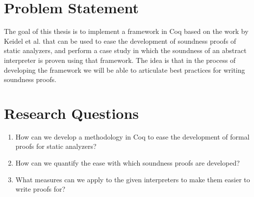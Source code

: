 
\section{Problem Statement}
The goal of this thesis is to implement a framework in Coq based on the work by 
Keidel et al. that can be used to ease the development of soundness
proofs of static analyzers, and perform a case study in which the soundness of 
an abstract interpreter is proven using that framework. 
The idea is that in the process of
developing the framework we will be able to articulate best practices for
writing soundness proofs.

\section{Research Questions}

\begin{center}
	\begin{enumerate}
		\item
How can we develop a methodology in Coq to ease the development of
formal proofs for static analyzers?

		\item
	How can we quantify the ease with which soundness proofs are developed?

		\item
	What measures can we apply to the given interpreters to make them easier to
	write proofs for?
	\end{enumerate}
\end{center}
